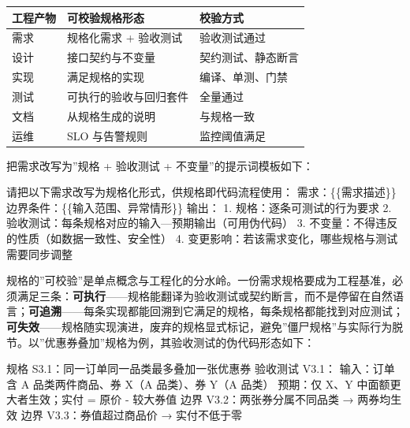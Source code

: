 \documentclass[
]{ctexbook}
\newenvironment{Shaded}{
  \ttfamily\small
}{}
\newcommand{\NormalTok}[1]{#1}
\newcounter{none}
\begin{document}
{\def\LTcaptype{none} %
\begin{longtable}[]{@{}lll@{}}
\toprule\noalign{}
工程产物 & 可校验规格形态 & 校验方式 \\
\midrule\noalign{}
\endhead
\bottomrule\noalign{}
\endlastfoot
需求 & 规格化需求 + 验收测试 & 验收测试通过 \\
设计 & 接口契约与不变量 & 契约测试、静态断言 \\
实现 & 满足规格的实现 & 编译、单测、门禁 \\
测试 & 可执行的验收与回归套件 & 全量通过 \\
文档 & 从规格生成的说明 & 与规格一致 \\
运维 & SLO 与告警规则 & 监控阈值满足 \\
\end{longtable}
}

把需求改写为''规格 + 验收测试 + 不变量''的提示词模板如下：

\begin{Shaded}
\begin{Highlighting}[]
\NormalTok{请把以下需求改写为规格化形式，供规格即代码流程使用：}
\NormalTok{需求：\{\{需求描述\}\}}
\NormalTok{边界条件：\{\{输入范围、异常情形\}\}}
\NormalTok{输出：}
\NormalTok{1. 规格：逐条可测试的行为要求}
\NormalTok{2. 验收测试：每条规格对应的输入—预期输出（可用伪代码）}
\NormalTok{3. 不变量：不得违反的性质（如数据一致性、安全性）}
\NormalTok{4. 变更影响：若该需求变化，哪些规格与测试需要同步调整}
\end{Highlighting}
\end{Shaded}

规格的''可校验''是单点概念与工程化的分水岭。一份需求规格要成为工程基准，必须满足三条：\textbf{可执行}------规格能翻译为验收测试或契约断言，而不是停留在自然语言；\textbf{可追溯}------每条实现都能回溯到它满足的规格，每条规格都能找到对应测试；\textbf{可失效}------规格随实现演进，废弃的规格显式标记，避免''僵尸规格''与实际行为脱节。以''优惠券叠加''规格为例，其验收测试的伪代码形态如下：

\begin{Shaded}
\begin{Highlighting}[]
\NormalTok{规格 S3.1：同一订单同一品类最多叠加一张优惠券}
\NormalTok{验收测试 V3.1：}
\NormalTok{  输入：订单含 A 品类两件商品、券 X（A 品类）、券 Y（A 品类）}
\NormalTok{  预期：仅 X、Y 中面额更大者生效；实付 = 原价 {-} 较大券值}
\NormalTok{  边界 V3.2：两张券分属不同品类 → 两券均生效}
\NormalTok{  边界 V3.3：券值超过商品价 → 实付不低于零}
\end{Highlighting}
\end{Shaded}
\end{document}
